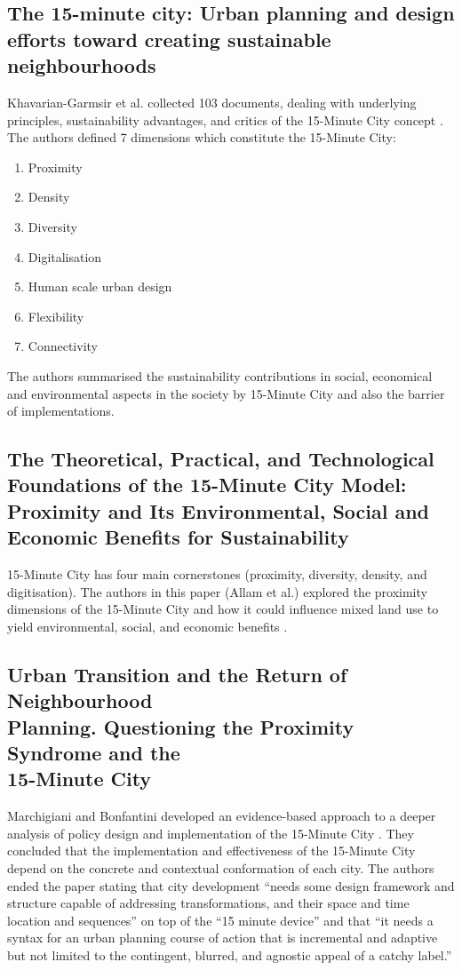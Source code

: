 \subsection{The 15-minute city: Urban planning and design efforts toward creating sustainable neighbourhoods}

Khavarian-Garmsir et al. collected 103 documents, dealing with underlying principles, sustainability advantages, and critics of the 15-Minute City concept \cite{khavarian-garmsir_15-minute_2023}. The authors defined 7 dimensions which constitute the 15-Minute City:

\begin{enumerate}
    \item Proximity
    \item Density
    \item Diversity
    \item Digitalisation
    \item Human scale urban design
    \item Flexibility
    \item Connectivity
\end{enumerate}

The authors summarised the sustainability contributions in social, economical and environmental aspects in the society by 15-Minute City and also the barrier of implementations.

\subsection{The Theoretical, Practical, and Technological Foundations of the 15-Minute City Model: Proximity and Its Environmental, Social and Economic Benefits for Sustainability}

15-Minute City has four main cornerstones (proximity, diversity, density, and digitisation). The authors in this paper (Allam et al.) explored the proximity dimensions of the 15-Minute City and how it could influence mixed land use to yield environmental, social, and economic benefits \cite{allam_theoretical_2022}.

\subsection{Urban Transition and the Return of Neighbourhood \\ Planning. Questioning the Proximity Syndrome and the \\ 15-Minute City}

Marchigiani and Bonfantini developed an evidence-based approach to a deeper analysis of policy design and implementation of the 15-Minute City \cite{marchigiani_urban_2022}. They concluded that the implementation and effectiveness of the 15-Minute City depend on the concrete and contextual conformation of each city. The authors ended the paper stating that city development ``needs some design framework and structure capable of addressing transformations, and their space and time location and sequences” on top of the ``15 minute device” and that ``it needs a syntax for an urban planning course of action that is incremental and adaptive but not limited to the contingent, blurred, and agnostic appeal of a catchy label.”